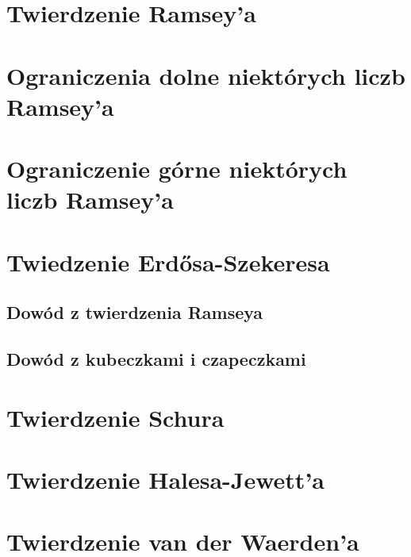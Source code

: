 \section{Twierdzenie Ramsey'a}


\section{Ograniczenia dolne niektórych liczb Ramsey'a}


\section{Ograniczenie górne niektórych liczb Ramsey'a}


\section{Twiedzenie Erd\H{o}sa-Szekeresa}
\subsection{Dowód z twierdzenia Ramseya}


\subsection{Dowód z kubeczkami i czapeczkami}


\section{Twierdzenie Schura}


\section{Twierdzenie Halesa-Jewett'a}


\section{Twierdzenie van der Waerden'a}


